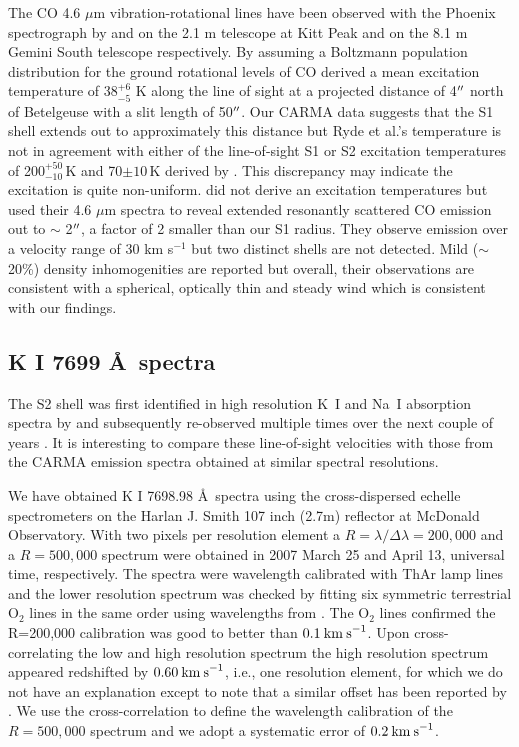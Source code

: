 \documentclass[iop]{emulateapj}
\begin{document}
The CO 4.6 $\mu$m vibration-rotational lines have been observed with the Phoenix spectrograph \citep{1998SPIE.3354..810H} by \cite{1999A&A...347L..35R} and \cite{2009AJ....137.3558S} on the 2.1 m telescope at Kitt Peak and on the 8.1 m Gemini South telescope respectively. By assuming a Boltzmann population distribution for the ground rotational levels of CO \cite{1999A&A...347L..35R}  derived a mean excitation temperature of 38${}^{+6}_{-5}$ K along the line of sight at a projected distance of 4$\mbox{$^{\prime\prime}$}$ north of Betelgeuse with a slit length of 50$\mbox{$^{\prime\prime}$}$. Our CARMA data suggests that the S1 shell extends out to approximately this distance but Ryde et al.'s temperature is not in agreement with either of the line-of-sight S1 or S2 excitation temperatures of 200${}^{+50}_{-10}$\,K and 70$\pm 10$\,K derived by \cite{1979ApJ...233L.135B}. This discrepancy may indicate the excitation is quite non-uniform.
\cite{2009AJ....137.3558S} did not derive an excitation temperatures but used their 4.6 $\mu$m spectra to reveal extended resonantly scattered CO emission out to $\sim$ 2$\mbox{$^{\prime\prime}$}$, a factor of 2 smaller than our S1 radius. They observe emission over a velocity range of 30 km s${}^{-1}$ but two distinct shells are not detected. Mild ($\sim$ 20\%) density inhomogenities are reported but overall, their observations are consistent with a spherical, optically thin and steady wind which is consistent with our findings.

\subsection{K I 7699 \AA \ spectra}

The S2 shell was first identified in high resolution K~I and Na~I absorption spectra by \cite{1975ApJ...199..427G} and subsequently re-observed multiple times over the next couple of years \citep{1979QJRAS..20..361G}. It is interesting to compare these line-of-sight velocities with those from the CARMA emission spectra obtained at similar spectral resolutions.

We have obtained K I 7698.98 \AA \ spectra using the cross-dispersed echelle spectrometers on the Harlan J. Smith 107 inch (2.7m) reflector at McDonald Observatory. With two pixels per resolution element a $R=\lambda/\Delta\lambda=200,000$ and a $R=500,000$ spectrum were obtained in 2007 March 25 and April 13, universal time, respectively. The spectra were wavelength calibrated with ThAr lamp lines and the lower resolution spectrum was checked by fitting six symmetric terrestrial O${}_2$ lines in the same order using wavelengths from \cite{1948ApJ...108..167B}. The O${}_2$ lines confirmed the R=200,000 calibration was good to better than $0.1\>{\rm km\>s}^{-1}$. Upon cross-correlating the low and high resolution spectrum the high resolution spectrum appeared redshifted by $0.60\>{\rm km\>s}^{-1}$, i.e., one resolution element, for which we do not have an explanation except to note that a similar offset has been reported by \cite{1994ApJ...436..152W}. We use the cross-correlation to define the wavelength calibration of the $R=500,000$ spectrum and we adopt a systematic error of $0.2\>{\rm km\>s}^{-1}$.
\end{document}

